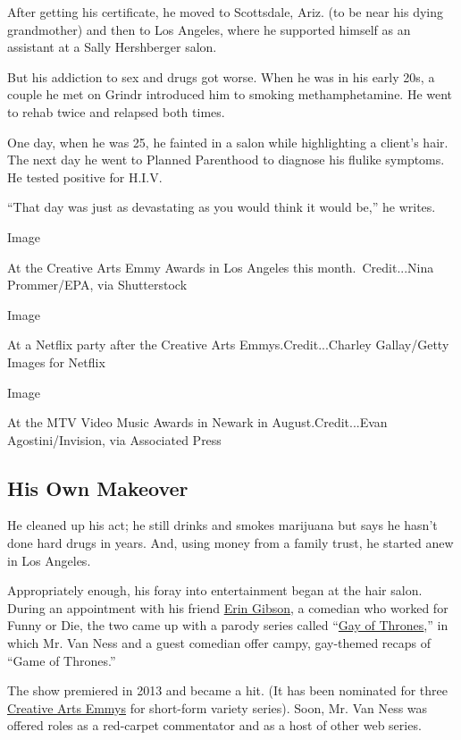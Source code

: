 After getting his certificate, he moved to Scottsdale, Ariz. (to be near
his dying grandmother) and then to Los Angeles, where he supported
himself as an assistant at a Sally Hershberger salon.

But his addiction to sex and drugs got worse. When he was in his early
20s, a couple he met on Grindr introduced him to smoking
methamphetamine. He went to rehab twice and relapsed both times.

One day, when he was 25, he fainted in a salon while highlighting a
client's hair. The next day he went to Planned Parenthood to diagnose
his flulike symptoms. He tested positive for H.I.V.

``That day was just as devastating as you would think it would be,'' he
writes.

Image

At the Creative Arts Emmy Awards in Los Angeles this
month.~Credit...Nina Prommer/EPA, via Shutterstock

Image

At a Netflix party after the Creative Arts Emmys.Credit...Charley
Gallay/Getty Images for Netflix

Image

At the MTV Video Music Awards in Newark in August.Credit...Evan
Agostini/Invision, via Associated Press

\hypertarget{his-own-makeover}{%
\subsection{His Own Makeover}\label{his-own-makeover}}

He cleaned up his act; he still drinks and smokes marijuana but says he
hasn't done hard drugs in years. And, using money from a family trust,
he started anew in Los Angeles.

Appropriately enough, his foray into entertainment began at the hair
salon. During an appointment with his friend
\href{http://www.eringibson.com}{Erin Gibson}, a comedian who worked for
Funny or Die, the two came up with a parody series called
``\href{https://www.youtube.com/watch?v=N0yi0RQvEi0}{Gay of Thrones},''
in which Mr. Van Ness and a guest comedian offer campy, gay-themed
recaps of ``Game of Thrones.''

The show premiered in 2013 and became a hit. (It has been nominated for
three \href{https://www.emmys.com/shows/gay-thrones}{Creative Arts
Emmys} for short-form variety series). Soon, Mr. Van Ness was offered
roles as a red-carpet commentator and as a host of other web series.


